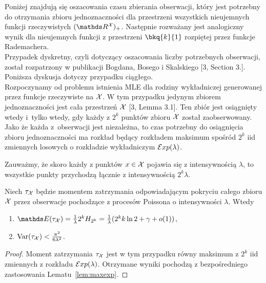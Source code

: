 \noindent
Poniżej znajdują się oszacowania czasu zbierania obserwacji, który jest potrzebny do otrzymania zbioru jednoznaczności dla przestrzeni wszystkich nieujemnych funkcji rzeczywistych $(\R^{\set{X}})_+$. Następnie rozważany jest analogiczny wynik dla nieujemnych funkcji z przestrzeni $\bkq{k}{1}$ rozpiętej przez funkcje Rademachera.\\

\noindent
Przypadek dyskretny, czyli dotyczący oszacowania liczby potrzebnych obserwacji, został rozpatrzony w publikacji Bogdana, Bosego i Skalskiego [3, Section 3.]. Poniższa dyskusja dotyczy przypadku ciągłego.\\

\noindent
Rozpoczynamy od problemu istnienia MLE dla rodziny wykładniczej generowanej przez funkcje rzeczywiste na $\mathcal{X}$. W tym przypadku jedynym zbiorem jednoznaczności jest cała przestrzeń $\mathcal{X}$ [3, Lemma 3.1]. Ten zbiór jest osiągnięty wtedy i~tylko wtedy, gdy każdy z $2^k$ punktów zbioru $\mathcal{X}$ został zaobserwowany. Jako że każda z~obserwacji jest niezależna, to czas potrzebny do osiągnięcia zbioru jednoznaczności ma rozkład będący rozkładem maksimum spośród $2^k$ iid zmiennych losowych o rozkładzie wykładniczym $\mathcal{E}xp(\lambda)$.

\noindent
Zauważmy, że skoro każdy z punktów $x\in\mathcal{X}$ pojawia się z intensywnością $\lambda$, to wszystkie punkty przychodzą łącznie z intensywnością $2^k\lambda$.

\begin{lemma}
Niech $\tau_{\mathcal{X}}$ będzie momentem zatrzymania odpowiadającym pokryciu całego zbioru $\mathcal{X}$ przez obserwacje pochodzące z procesów Poissona o intensywności $\lambda$. Wtedy
\begin{enumerate}
    \item $\EE(\tau_{\set{X}}) = \frac{1}{\lambda} 2^k H_{2^k} = \frac{1}{\lambda} (2^k k \ln 2 + \gamma + o(1))$,
    \item ${\rm Var}(\tau_{\mathcal{X}}) < \frac{\pi^2}{ 6\lambda^2}$.
\end{enumerate}
\end{lemma}
\begin{proof}
Moment zatrzymania $\tau_{\mathcal{X}}$ jest w tym przypadku równy maksimum z $2^k$ iid zmiennych z rozkładu $\mathcal{E}xp(\lambda)$. Otrzymane wyniki pochodzą z bezpośredniego zastosowania Lematu~\ref{lem:maxexp}.   
\end{proof}

